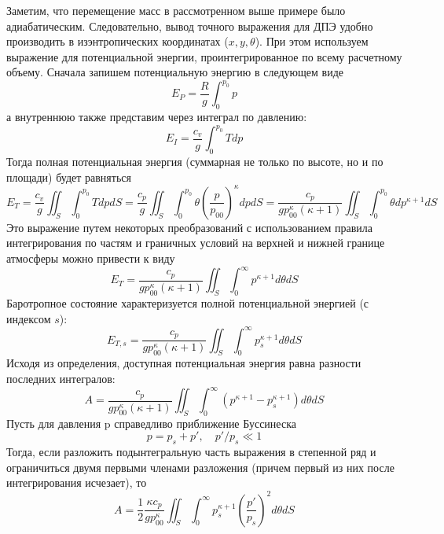 \documentclass[12pt,a4paper]{report}
\begin{document}
Заметим, что перемещение масс в рассмотренном выше примере было адиабатическим. Следовательно, вывод точного выражения для ДПЭ удобно производить в изэнтропических координатах ($x,y,\theta$). При этом используем выражение для  потенциальной энергии, проинтегрированное по всему расчетному объему. Сначала запишем потенциальную энергию в следующем виде
\begin{equation}
E_P=\frac{R}{g}\int_0^{p_0}p
\end{equation}
а внутреннюю также представим через интеграл по давлению:
\begin{equation}
E_I=\frac{c_v}{g}\int_0^{p_0}Tdp
\end{equation}
Тогда полная потенциальная энергия (суммарная не только по высоте, но и по площади) будет равняться
\begin{equation}
E_T=\frac{c_v}{g}\iint_S\int_0^{p_0}TdpdS = \frac{c_p}{g}\iint_S\int_0^{p_0}\theta\left(\frac{p}{p_{00}}\right)^\kappa dpdS = \frac{c_p}{gp_{00}^\kappa (\kappa+1)}\iint_S\int_0^{p_0}\theta dp^{\kappa+1}dS
\end{equation}
Это выражение путем некоторых преобразований с использованием правила интегрирования по частям и граничных условий на верхней и нижней границе атмосферы можно привести к виду
\begin{equation}
E_T=\frac{c_p}{gp_{00}^\kappa (\kappa+1)}\iint_S\int_0^{\infty}p^{\kappa+1}d\theta dS
\end{equation}
Баротропное состояние характеризуется полной потенциальной энергией (с индексом $s$):
\begin{equation}
E_{T,s}=\frac{c_p}{gp_{00}^\kappa (\kappa+1)}\iint_S\int_0^{\infty}p_s^{\kappa+1}d\theta dS
\end{equation}
Исходя из определения, доступная потенциальная энергия равна разности последних интегралов:
\begin{equation}
A=\frac{c_p}{gp_{00}^\kappa (\kappa+1)}\iint_S\int_0^{\infty}\left(p^{\kappa+1} - p_s^{\kappa+1}\right)d\theta dS
\end{equation}
Пусть для давления p справедливо приближение Буссинеска
\begin{equation}
p=p_s+p', \quad p'/p_s \ll 1
\end{equation}
Тогда, если разложить подынтегральную часть выражения в степенной ряд и ограничиться двумя первыми членами разложения (причем первый из них после интегрирования исчезает), то
\begin{equation}
A=\frac{1}{2}\frac{\kappa c_p}{gp_{00}^\kappa}\iint_S\int_0^{\infty}p_s^{\kappa+1}\left(\frac{p'}{p_s}\right)^2 d\theta dS
\end{equation}
\end{document}
